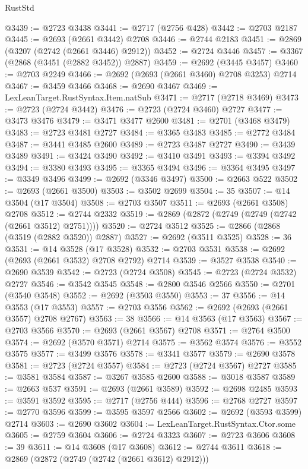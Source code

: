 \begin{lexlean}{RustStd}
\begin{coremodule}
@3439 := @2723 @3438
@3441 := @2717 (@2756 @428)
@3442 := @2703 @2187
@3445 := @2693 (@2661 @3442) @2708
@3446 := @2744 @2183
@3451 := @2869 (@3207 (@2742 (@2661 @3446) @2912))
@3452 := @2724 @3446
@3457 := @3367 (@2868 (@3451 (@2882 @3452)) @2887)
@3459 := @2692 (@3445 @3457)
@3460 := @2703 @2249
@3466 := @2692 (@2693 (@2661 @3460) @2708 @3253) @2714
@3467 := @3459 @3466
@3468 := @2690 @3467
@3469 := LexLeanTarget.RustSyntax.Item.natSub
@3471 := @2717 (@2718 @3469)
@3473 := @2723 (@2724 @3442)
@3476 := @2723 (@2724 @3460) @2727
@3477 := @3473 @3476
@3479 := @3471 @3477 @2600
@3481 := @2701 (@3468 @3479)
@3483 := @2723 @3481 @2727
@3484 := @3365 @3483
@3485 := @2772 @3484
@3487 := @3441 @3485 @2600
@3489 := @2723 @3487 @2727
@3490 := @3439 @3489
@3491 := @3424 @3490
@3492 := @3410 @3491
@3493 := @3394 @3492
@3494 := @3380 @3493
@3495 := @3365 @3494
@3496 := @3364 @3495
@3497 := @3349 @3496
@3499 := @2692 (@3346 @3497)
@3500 := @2663 @522
@3502 := @2693 (@2661 @3500)
@3503 := @3502 @2699
@3504 := 35
@3507 := @14 @3504 (@17 @3504)
@3508 := @2703 @3507
@3511 := @2693 (@2661 @3508) @2708
@3512 := @2744 @2332
@3519 := @2869 (@2872 (@2749 (@2749 (@2742 (@2661 @3512) @2751))))
@3520 := @2724 @3512
@3525 := @2866 (@2868 (@3519 (@2882 @3520)) @2887)
@3527 := @2692 (@3511 @3525)
@3528 := 36
@3531 := @14 @3528 (@17 @3528)
@3532 := @2703 @3531
@3538 := @2692 (@2693 (@2661 @3532) @2708 @2792) @2714
@3539 := @3527 @3538
@3540 := @2690 @3539
@3542 := @2723 (@2724 @3508)
@3545 := @2723 (@2724 @3532) @2727
@3546 := @3542 @3545
@3548 := @2800 @3546 @2566
@3550 := @2701 (@3540 @3548)
@3552 := @2692 (@3503 @3550)
@3553 := 37
@3556 := @14 @3553 (@17 @3553)
@3557 := @2703 @3556
@3562 := @2692 (@2693 (@2661 @3557) @2708 @2767)
@3563 := 38
@3566 := @14 @3563 (@17 @3563)
@3567 := @2703 @3566
@3570 := @2693 (@2661 @3567) @2708
@3571 := @2764 @3500
@3574 := @2692 (@3570 @3571) @2714
@3575 := @3562 @3574
@3576 := @3552 @3575
@3577 := @3499 @3576
@3578 := @3341 @3577
@3579 := @2690 @3578
@3581 := @2723 (@2724 @3557)
@3584 := @2723 (@2724 @3567) @2727
@3585 := @3581 @3584
@3587 := @3267 @3585 @2600
@3588 := @3018 @3587
@3589 := @2663 @537
@3591 := @2693 (@2661 @3589)
@3592 := @2698 @2485
@3593 := @3591 @3592
@3595 := @2717 (@2756 @444)
@3596 := @2768 @2727
@3597 := @2770 @3596
@3599 := @3595 @3597 @2566
@3602 := @2692 (@3593 @3599) @2714
@3603 := @2690 @3602
@3604 := LexLeanTarget.RustSyntax.Ctor.some
@3605 := @2759 @3604
@3606 := @2724 @3323
@3607 := @2723 @3606
@3608 := 39
@3611 := @14 @3608 (@17 @3608)
@3612 := @2744 @3611
@3618 := @2869 (@2872 (@2749 (@2742 (@2661 @3612) @2912)))

\end{coremodule}
\end{lexlean}

